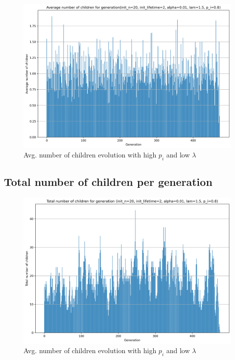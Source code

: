 \documentclass[conference]{IEEEtran}
\begin{document}
        \begin{figure}[!ht]
            \centering
            \includegraphics[width=\columnwidth]{media/in_p_20_in_lt_2_a_0.01_l_1.5_p_i_0.8/av.png}
            \caption[short]{Avg. number of children evolution with high $p_i$ and low $\lambda$}
            \label{fig:av_grow}
        \end{figure}

    \subsection{Total number of children per generation}

        \begin{figure}[!ht]
            \centering
            \includegraphics[width=\columnwidth]{media/in_p_20_in_lt_2_a_0.01_l_1.5_p_i_0.8/tot.png}
            \caption[short]{Avg. number of children evolution with high $p_i$ and low $\lambda$}
            \label{fig:tot_grow}
        \end{figure}
\end{document}
